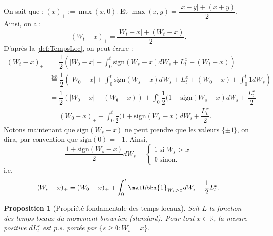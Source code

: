 \documentclass[openany]{book}
\makeatletter
\newcommand{\R}{\mathbb{R}}
\newcommand{\1}{\mathbbm{1}}
\newcommand{\sign}{\text{sign}}
\renewenvironment{proof}[1][\textbf{\textit{Démonstration}}]{%
  \par\pushQED{\qed}%
  \normalfont\topsep6\p@\@plus6\p@\relax
  \trivlist\item[\hskip\labelsep
    #1\@addpunct{.}]\ignorespaces
}{%
  \popQED\endtrivlist\@endpefalse
}
\theoremstyle{thmfont}
\theoremstyle{deffont}
\theoremstyle{thmfont}
\newtheorem{prop}[prop]{Proposition}
\theoremstyle{deffont}
\makeatother
\begin{document}
\begin{proof}
  On sait que : $(x)_+ := \max(x, 0)$. Et $\max(x,y) = \dfrac{|x-y| + (x+y)}{2}$.
  Ainsi, on a : $$(W_t - x)_+ = \dfrac{|W_t - x| + (W_t - x)}{2}.$$
  D'après la \autoref{def:TempsLoc}, on peut écrire :
  \begin{align*}
    (W_t - x)_+ &= \dfrac{1}{2}\left(|W_0 - x| + \int_0^t\sign(W_s - x)dW_s + L_t^x + (W_t - x)\right)\\
    &\overset{\text{Itō}}{=} \dfrac{1}{2} \left(|W_0 - x| + \int_0^t\sign(W_s - x)dW_s + L_t^x + (W_0 - x) + \int_0^t 1 dW_s \right)\\
    &= \dfrac{1}{2} \left(|W_0 - x| + (W_0 - x) \right) + \int_0^t\dfrac{1}{2}(1 + \sign(W_s - x)dW_s + \dfrac{L_t^x}{2}\\
    &= (W_0 - x)_+ + \int_0^t\dfrac{1}{2}(1 + \sign(W_s - x) dW_s + \dfrac{L_t^x}{2}.
  \end{align*}
  Notons maintenant que $\sign(W_s - x)$ ne peut prendre que les valeurs $\{\pm 1\}$, on dira, par convention que $\sign(0) = -1$. Ainsi,
  $$ \dfrac{1 + \sign(W_s - x)}{2}dW_s =
  \begin{cases} 1\; \text{si } W_s > x\\
                0 \; \text{sinon.}
  \end{cases}
  $$
 i.e.
 $$(W_t - x)_+ = (W_0 - x)_+ + \int_0^t\1_{W_s > x} dW_s + \frac{1}{2}L_t^x.$$
  
\end{proof}

\begin{prop}[Propriété fondamentale des temps locaux]
Soit $L$ la fonction des temps locaux du mouvment brownien (standard). Pour tout $x \in \R$, la mesure positive $dL^x_t$ est p.s. portée par $\{s \geq 0 : W_s = x\}$.  
\end{prop}
\end{document}

